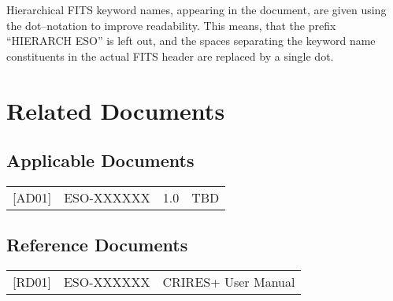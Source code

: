 Hierarchical FITS keyword names, appearing in the document, are given using the
dot--notation to improve readability. This means, that the prefix ``HIERARCH
ESO'' is left out, and the spaces separating the keyword name constituents in
the actual FITS header are replaced by a single dot.

\section{Related Documents}
\label{sec:doc-related}

\subsection{Applicable Documents}
\label{sec:doc-applicable}

\begin{tabularx}{\linewidth}{lllX}
  {[}AD01{]} & ESO-XXXXXX & 1.0
             & TBD \\
\end{tabularx}

\subsection{Reference Documents}
\label{sec:doc-reference}

\begin{tabularx}{\linewidth}{llX}
  {[}RD01{]} & ESO-XXXXXX
             & CRIRES+ User Manual \\
\end{tabularx}


